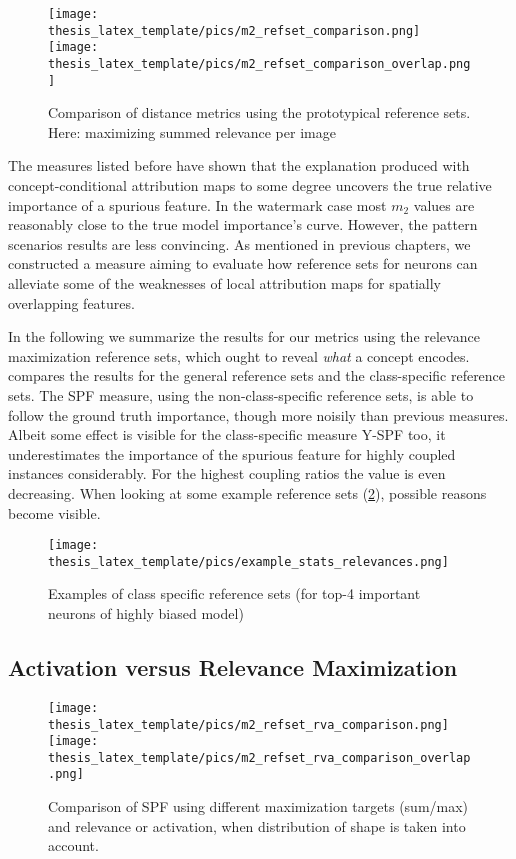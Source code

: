 \begin{figure}[ht!]
    \centering
    \texttt{[image: thesis\_latex\_template/pics/m2\_refset\_comparison.png]}
    \texttt{[image: thesis\_latex\_template/pics/m2\_refset\_comparison\_overlap.png]}
    \caption[Reference Sets, Comparison of Metrics ]{Comparison of distance metrics using the prototypical reference sets. Here: maximizing summed relevance per image }
    \label{fig:m2_refset_relevance}
\end{figure}
The measures listed before have shown that the explanation produced with concept-conditional attribution maps to some degree uncovers the true relative importance of a spurious feature.
In the watermark case most $m_2$ values are reasonably close to the true model importance's curve.
However, the pattern scenarios results are less convincing. As mentioned in previous chapters, we constructed a measure aiming to evaluate how reference sets for neurons can alleviate some of the weaknesses of local attribution maps for spatially overlapping features. 

In the following we summarize the results for our metrics using the relevance maximization reference sets, which ought to reveal \textit{what} a concept encodes.  compares the results for the general reference sets and the class-specific reference sets. 
The SPF measure, using the non-class-specific reference sets, is able to follow the ground truth importance, though more noisily than previous measures. 
Albeit some effect is visible for the class-specific measure Y-SPF too, it underestimates the importance of the spurious feature for highly coupled instances considerably. For the highest coupling ratios the value is even decreasing. 
When looking at some example reference sets (\cref{fig:class_reference_sets}), possible reasons become visible. 

\begin{figure}[t!]
    \centering
    \texttt{[image: thesis\_latex\_template/pics/example\_stats\_relevances.png]}
    \caption{Examples of class specific reference sets (for top-4 important neurons of highly biased model)}
    \label{fig:class_reference_sets}
\end{figure}

\subsection{Activation versus Relevance Maximization}
\begin{figure}[ht!]
    \centering
    \texttt{[image: thesis\_latex\_template/pics/m2\_refset\_rva\_comparison.png]}
    \texttt{[image: thesis\_latex\_template/pics/m2\_refset\_rva\_comparison\_overlap.png]}
    \caption[Reference Sets, Relevance/Activation, Sum/Max ]{
    Comparison of SPF using different maximization targets (sum/max) and relevance or activation, when distribution of shape is taken into account.
    }
    \label{fig:m2_refset_rel_vs_act}
\end{figure}


